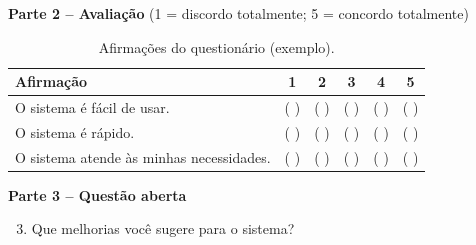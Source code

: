\textbf{Parte 2 -- Avaliação} (1 = discordo totalmente; 5 = concordo totalmente)

\begin{table}[htb]
	\centering
	\caption{Afirmações do questionário (exemplo).}
	\label{tab_questionario}
	\begin{tabularx}{\textwidth}{Xccccc}
		\toprule
		Afirmação & 1 & 2 & 3 & 4 & 5 \\
		\midrule
		O sistema é fácil de usar. & ( ) & ( ) & ( ) & ( ) & ( ) \\
		O sistema é rápido. & ( ) & ( ) & ( ) & ( ) & ( ) \\
		O sistema atende às minhas necessidades. & ( ) & ( ) & ( ) & ( ) & ( ) \\
		\bottomrule
	\end{tabularx}
\end{table}

\textbf{Parte 3 -- Questão aberta}

\begin{enumerate}
	\setcounter{enumi}{2}
	\item Que melhorias você sugere para o sistema?
\end{enumerate}
